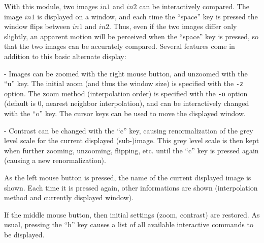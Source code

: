 With this module, two images $in1$ and $in2$ can be interactively compared.
The image $in1$ is displayed on a window, and each time the ``space'' key
is pressed the window flips between $in1$ and $in2$. Thus, even if the
two images differ only slightly, an apparent motion will be perceived when 
the ``space'' key is pressed, so that the two images can be accurately 
compared. Several features come in addition to this basic alternate
display:

\medskip

- Images can be zoomed with the right mouse button, and unzoomed with the
``u'' key. The initial zoom (and thus the window size) is specified 
with the \verb+-z+ option. The zoom method (interpolation order) is
specified with the \verb+-o+ option (default is 0, nearest neighbor 
interpolation), and can be interactively changed with the ``o'' key.
The cursor keys can be used to move the displayed window.

\medskip

- Contrast can be changed with the ``c'' key, causing renormalization
of the grey level scale for the current displayed (sub-)image. This
grey level scale is then kept when further zooming, unzooming, flipping,
etc. until the ``c'' key is pressed again (causing a new renormalization).

\medskip

As the left mouse button is pressed, the name of the current displayed 
image is shown. Each time it is pressed again, other informations 
are shown (interpolation method and currently displayed window).  

\medskip

If the middle mouse button, then initial settings (zoom, contrast) are 
restored. As usual, pressing the ``h'' key causes a list of all available
interactive commands to be displayed.
